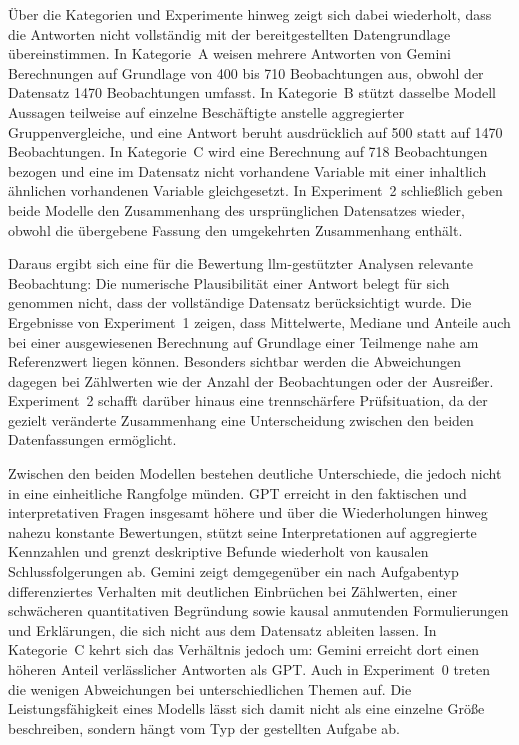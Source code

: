 Über die Kategorien und Experimente hinweg zeigt sich dabei wiederholt, dass die Antworten nicht vollständig mit der bereitgestellten Datengrundlage übereinstimmen. In Kategorie~A weisen mehrere Antworten von Gemini Berechnungen auf Grundlage von 400 bis 710 Beobachtungen aus, obwohl der Datensatz 1470 Beobachtungen umfasst. In Kategorie~B stützt dasselbe Modell Aussagen teilweise auf einzelne Beschäftigte anstelle aggregierter Gruppenvergleiche, und eine Antwort beruht ausdrücklich auf 500 statt auf 1470 Beobachtungen. In Kategorie~C wird eine Berechnung auf 718 Beobachtungen bezogen und eine im Datensatz nicht vorhandene Variable mit einer inhaltlich ähnlichen vorhandenen Variable gleichgesetzt. In Experiment~2 schließlich geben beide Modelle den Zusammenhang des ursprünglichen Datensatzes wieder, obwohl die übergebene Fassung den umgekehrten Zusammenhang enthält.

Daraus ergibt sich eine für die Bewertung \gls{llm}-gestützter Analysen relevante Beobachtung: Die numerische Plausibilität einer Antwort belegt für sich genommen nicht, dass der vollständige Datensatz berücksichtigt wurde. Die Ergebnisse von Experiment~1 zeigen, dass Mittelwerte, Mediane und Anteile auch bei einer ausgewiesenen Berechnung auf Grundlage einer Teilmenge nahe am Referenzwert liegen können. Besonders sichtbar werden die Abweichungen dagegen bei Zählwerten wie der Anzahl der Beobachtungen oder der Ausreißer. Experiment~2 schafft darüber hinaus eine trennschärfere Prüfsituation, da der gezielt veränderte Zusammenhang eine Unterscheidung zwischen den beiden Datenfassungen ermöglicht.

Zwischen den beiden Modellen bestehen deutliche Unterschiede, die jedoch nicht in eine einheitliche Rangfolge münden. GPT erreicht in den faktischen und interpretativen Fragen insgesamt höhere und über die Wiederholungen hinweg nahezu konstante Bewertungen, stützt seine Interpretationen auf aggregierte Kennzahlen und grenzt deskriptive Befunde wiederholt von kausalen Schlussfolgerungen ab. Gemini zeigt demgegenüber ein nach Aufgabentyp differenziertes Verhalten mit deutlichen Einbrüchen bei Zählwerten, einer schwächeren quantitativen Begründung sowie kausal anmutenden Formulierungen und Erklärungen, die sich nicht aus dem Datensatz ableiten lassen. In Kategorie~C kehrt sich das Verhältnis jedoch um: Gemini erreicht dort einen höheren Anteil verlässlicher Antworten als GPT. Auch in Experiment~0 treten die wenigen Abweichungen bei unterschiedlichen Themen auf. Die Leistungsfähigkeit eines Modells lässt sich damit nicht als eine einzelne Größe beschreiben, sondern hängt vom Typ der gestellten Aufgabe ab.


